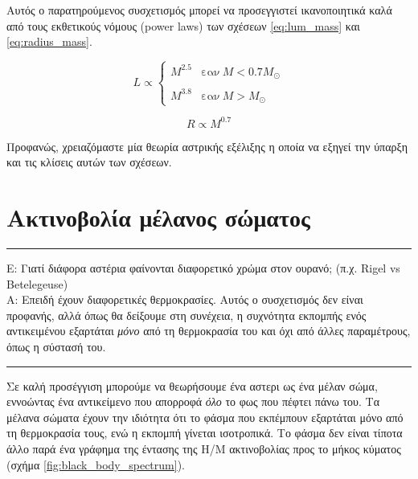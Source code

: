 Αυτός ο παρατηρούμενος συσχετισμός μπορεί να προσεγγιστεί ικανοποιητικά καλά από τους εκθετικούς νόμους (power laws) των σχέσεων \eqref{eq:lum_mass} και \eqref{eq:radius_mass}.

\begin{equation}
    \label{eq:lum_mass}
    L \propto 
    \begin{cases}
        M^{2.5} & \text{εαν} \ M < 0.7 M_{\odot} \\\\
        M^{3.8} & \text{εαν} \ M > M_{\odot}
    \end{cases}
\end{equation}

\begin{equation}
    \label{eq:radius_mass}
    R \propto M^{0.7}
\end{equation}

Προφανώς, χρειαζόμαστε μία θεωρία αστρικής εξέλιξης η οποία να εξηγεί την ύπαρξη και τις κλίσεις αυτών των σχέσεων.


\section{Ακτινοβολία μέλανος σώματος}

{\color{red} \hrule}
Ε: Γιατί διάφορα αστέρια φαίνονται διαφορετικό χρώμα στον ουρανό; (π.χ. Rigel vs Betelegeuse)\\
A: Επειδή έχουν διαφορετικές θερμοκρασίες. Αυτός ο συσχετισμός δεν είναι προφανής, αλλά όπως θα δείξουμε στη συνέχεια, η συχνότητα εκπομπής ενός αντικειμένου εξαρτάται \textit{μόνο} από τη θερμοκρασία του και όχι από άλλες παραμέτρους, όπως η σύστασή του.
{\color{red} \hrule}

Σε καλή προσέγγιση μπορούμε να θεωρήσουμε ένα αστερι ως ένα μέλαν σώμα, εννοώντας ένα αντικείμενο που απορροφά \textit{όλο} το φως που πέφτει πάνω του. Τα μέλανα σώματα έχουν την ιδιότητα ότι το {\color{blue} φάσμα που εκπέμπουν εξαρτάται μόνο από τη θερμοκρασία τους, ενώ η εκπομπή γίνεται ισοτροπικά}. Το φάσμα δεν είναι τίποτα άλλο παρά ένα γράφημα της έντασης της Η/Μ ακτινοβολίας προς το μήκος κύματος (σχήμα \ref{fig:black_body_spectrum}).

